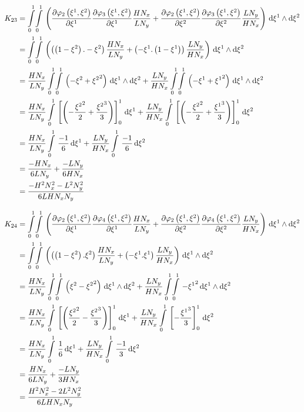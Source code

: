\begin{equation}
  \begin{aligned}
    K_{23}&=\giint{0}{1}{0}{1}{\pbrac{\delby{\lbfn{2}{\xione,\xitwo}}{\xione}\delby{\lbfn{3}{\xione,\xitwo}}{\xione}
        \dfrac{H N_{x}}{L N_{y}}+\delby{\lbfn{2}{\xione,\xitwo}}{\xitwo}\delby{\lbfn{3}{\xione,\xitwo}}{\xitwo}
        \dfrac{L N_{y}}{H N_{x}}}}{\xione}{\xitwo}\\
    &=\giint{0}{1}{0}{1}{\pbrac{\pbrac{\pbrac{1-\xitwo}.-\xitwo}\dfrac{H N_{x}}{L N_{y}}+
    \pbrac{-\xione.\pbrac{1-\xione}}\dfrac{L N_{y}}{H N_{x}}}}{\xione}{\xitwo} \\
    &=\dfrac{H N_{x}}{L N_{y}}\giint{0}{1}{0}{1}{\pbrac{-\xitwo+\xitwosq}}{\xione}{\xitwo}+
    \dfrac{L N_{y}}{H N_{x}}\giint{0}{1}{0}{1}{\pbrac{-\xione+\xionesq}}{\xione}{\xitwo} \\
    &=\dfrac{H N_{x}}{L N_{y}}\gint{0}{1}{\sqbrac{\pbrac{-\dfrac{\xitwosq}{2}+\dfrac{\xitwocube}{3}}}_{0}^{1}}{\xione}+
    \dfrac{L N_{y}}{H N_{x}}\gint{0}{1}{\sqbrac{\pbrac{-\dfrac{\xitwosq}{2}+\dfrac{\xionecube}{3}}}_{0}^{1}}{\xitwo} \\
    &=\dfrac{H N_{x}}{L N_{y}}\gint{0}{1}{\dfrac{-1}{6}}{\xione}+\dfrac{L N_{y}}{H N_{x}}\gint{0}{1}{\dfrac{-1}{6}}{\xitwo} \\
    &=\dfrac{-H N_{x}}{6 L N_{y}}+\dfrac{-L N_{y}}{6 H N_{x}} \\
    &=\dfrac{-H^{2}N_{x}^{2}-L^{2}N_{y}^{2}}{6 L H N_{x} N_{y}}
  \end{aligned}
\end{equation}

\begin{equation}
  \begin{aligned}
    K_{24}&=\giint{0}{1}{0}{1}{\pbrac{\delby{\lbfn{2}{\xione,\xitwo}}{\xione}\delby{\lbfn{4}{\xione,\xitwo}}{\xione}
        \dfrac{H N_{x}}{L N_{y}}+\delby{\lbfn{2}{\xione,\xitwo}}{\xitwo}\delby{\lbfn{4}{\xione,\xitwo}}{\xitwo}
        \dfrac{L N_{y}}{H N_{x}}}}{\xione}{\xitwo}\\
    &=\giint{0}{1}{0}{1}{\pbrac{\pbrac{\pbrac{1-\xitwo}.\xitwo}\dfrac{H N_{x}}{L N_{y}}+
    \pbrac{-\xione.\xione}\dfrac{L N_{y}}{H N_{x}}}}{\xione}{\xitwo} \\
    &=\dfrac{H N_{x}}{L N_{y}}\giint{0}{1}{0}{1}{\pbrac{\xitwo-\xitwosq}}{\xione}{\xitwo}+
    \dfrac{L N_{y}}{H N_{x}}\giint{0}{1}{0}{1}{-\xionesq}{\xione}{\xitwo} \\
    &=\dfrac{H N_{x}}{L N_{y}}\gint{0}{1}{\sqbrac{\pbrac{\dfrac{\xitwosq}{2}-\dfrac{\xitwocube}{3}}}_{0}^{1}}{\xione}+
    \dfrac{L N_{y}}{H N_{x}}\gint{0}{1}{\sqbrac{-\dfrac{\xionecube}{3}}_{0}^{1}}{\xitwo} \\
    &=\dfrac{H N_{x}}{L N_{y}}\gint{0}{1}{\dfrac{1}{6}}{\xione}+\dfrac{L N_{y}}{H N_{x}}\gint{0}{1}{\dfrac{-1}{3}}{\xitwo} \\
    &=\dfrac{H N_{x}}{6 L N_{y}}+\dfrac{-L N_{y}}{3 H N_{x}} \\
    &=\dfrac{H^{2}N_{x}^{2} - 2 L^{2}N_{y}^{2}}{6 L H N_{x} N_{y}}
  \end{aligned}
\end{equation}

